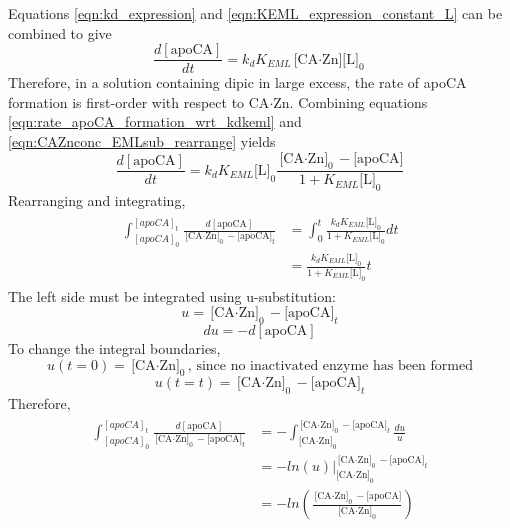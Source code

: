 Equations \eqref{eqn:kd_expression} and \eqref{eqn:KEML_expression_constant_L} can be combined to give
\begin{equation}\label{eqn:rate_apoCA_formation_wrt_kdkeml}
\frac{d[\text{apoCA}]}{dt}=k_{d}K_{EML}\text{[CA$\cdot$Zn][L]}_0
\end{equation}
Therefore, in a solution containing dipic in large excess, the rate of apoCA formation is first-order with respect to CA$\cdot$Zn. Combining equations \eqref{eqn:rate_apoCA_formation_wrt_kdkeml} and \eqref{eqn:CAZnconc_EMLsub_rearrange} yields
\begin{equation}\label{eqn:preintegration}
\frac{d[\text{apoCA}]}{dt}=k_{d}K_{EML}\text{[L]}_0\frac{\text{[CA$\cdot$Zn]}_0 - \text{[apoCA]}}{1+K_{EML}\text{[L]}_0}
\end{equation}
Rearranging and integrating,
\begin{align}\label{eqn:kdkeml_integral}
\begin{split}
\int_{[apoCA]_0}^{[apoCA]_t} \frac{d[\text{apoCA}]}{\text{[CA$\cdot$Zn]}_0 - \text{[apoCA]}_t} &= \int_0^t \frac{k_{d}K_{EML}\text{[L]}_0}{1+K_{EML}\text{[L]}_0}dt \\
&= \frac{k_{d}K_{EML}\text{[L]}_0}{1+K_{EML}\text{[L]}_0}t
\end{split}
\end{align}
The left side must be integrated using u-substitution:
\begin{equation*}
u=\text{[CA$\cdot$Zn]}_0 - \text{[apoCA]}_t
\end{equation*}
\begin{equation*}
du=-d[\text{apoCA}]
\end{equation*}
To change the integral boundaries,
\begin{equation*}
u(t=0)=\text{[CA$\cdot$Zn]}_0\text{, since no inactivated enzyme has been formed}
\end{equation*}
\begin{equation*}
u(t=t)=\text{[CA$\cdot$Zn]}_0 - \text{[apoCA]}_t
\end{equation*}
Therefore,
\begin{align}\label{eqn:long_integral}
\begin{split}
\int_{[apoCA]_0}^{[apoCA]_t} \frac{d[\text{apoCA}]}{\text{[CA$\cdot$Zn]}_0 - \text{[apoCA]}_t}
&=
-\int_{\text{[CA$\cdot$Zn]}_0}^{\text{[CA$\cdot$Zn]}_0 - \text{[apoCA]}_t} \frac{du}{u} \\
&=
-ln(u) \Big|_{\text{[CA$\cdot$Zn]}_0}^{\text{[CA$\cdot$Zn]}_0 - \text{[apoCA]}_t} \\
&= -ln \left( \frac{\text{[CA$\cdot$Zn]}_0 - \text{[apoCA]}}{\text{[CA$\cdot$Zn]}_0} \right)
\end{split}
\end{align}

